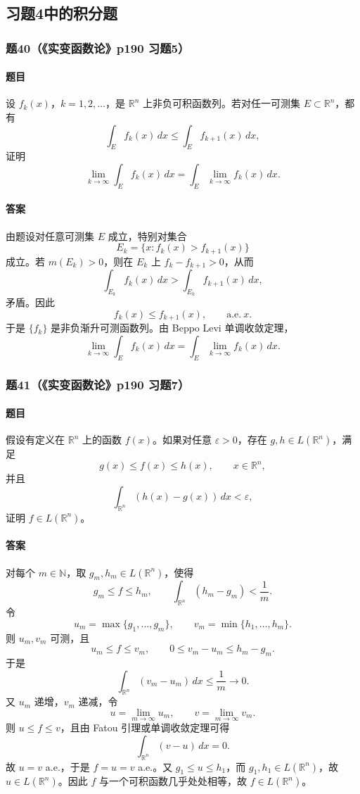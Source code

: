 \documentclass{article}
\newcommand{\R}{\mathbb{R}}
\newcommand{\N}{\mathbb{N}}
\newcommand{\eps}{\varepsilon}
\newcommand{\meas}{m}
\newcommand{\aee}{\text{a.e.}}
\begin{document}
\subsection{习题4中的积分题}

\subsubsection*{题40（《实变函数论》p190 习题5）}
\paragraph{题目}设 $f_k(x)$，$k=1,2,\ldots$，是 $\R^n$ 上非负可积函数列。若对任一可测集 $E\subset\R^n$，都有
\[
\int_E f_k(x)\,dx\le\int_E f_{k+1}(x)\,dx,
\]
证明
\[
\lim_{k\to\infty}\int_E f_k(x)\,dx
=
\int_E \lim_{k\to\infty}f_k(x)\,dx.
\]

\paragraph{答案}由题设对任意可测集 $E$ 成立，特别对集合
\[
E_k=\{x:f_k(x)>f_{k+1}(x)
\}
\]
成立。若 $\meas(E_k)>0$，则在 $E_k$ 上 $f_k-f_{k+1}>0$，从而
\[
\int_{E_k}f_k(x)\,dx>\int_{E_k}f_{k+1}(x)\,dx,
\]
矛盾。因此
\[
f_k(x)\le f_{k+1}(x),
\qquad \aee\ x.
\]
于是 $\{f_k\}$ 是非负渐升可测函数列。由 Beppo Levi 单调收敛定理，
\[
\lim_{k\to\infty}\int_E f_k(x)\,dx
=
\int_E \lim_{k\to\infty}f_k(x)\,dx.
\]

\subsubsection*{题41（《实变函数论》p190 习题7）}
\paragraph{题目}假设有定义在 $\R^n$ 上的函数 $f(x)$。如果对任意 $\eps>0$，存在 $g,h\in L(\R^n)$，满足
\[
g(x)\le f(x)\le h(x),
\qquad x\in\R^n,
\]
并且
\[
\int_{\R^n}(h(x)-g(x))\,dx<\eps,
\]
证明 $f\in L(\R^n)$。

\paragraph{答案}对每个 $m\in\N$，取 $g_m,h_m\in L(\R^n)$，使得
\[
g_m\le f\le h_m,
\qquad
\int_{\R^n}(h_m-g_m)<\frac1m.
\]
令
\[
u_m=\max\{g_1,
\ldots,g_m\},
\qquad
v_m=\min\{h_1,
\ldots,h_m\}.
\]
则 $u_m,v_m$ 可测，且
\[
u_m\le f\le v_m,
\qquad
0\le v_m-u_m\le h_m-g_m.
\]
于是
\[
\int_{\R^n}(v_m-u_m)\,dx\le\frac1m\to0.
\]
又 $u_m$ 递增，$v_m$ 递减，令
\[
u=\lim_{m\to\infty}u_m,
\qquad
v=\lim_{m\to\infty}v_m.
\]
则 $u\le f\le v$，且由 Fatou 引理或单调收敛定理可得
\[
\int_{\R^n}(v-u)\,dx=0.
\]
故 $u=v$ a.e.，于是 $f=u=v$ a.e.。又 $g_1\le u\le h_1$，而 $g_1,h_1\in L(\R^n)$，故 $u\in L(\R^n)$。因此 $f$ 与一个可积函数几乎处处相等，故 $f\in L(\R^n)$。
\end{document}
